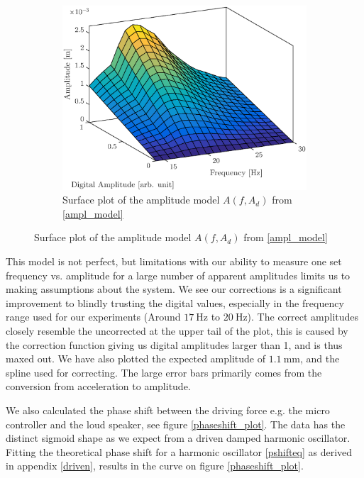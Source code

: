 \documentclass[12pt,oneside,a4paper]{article}
\numberwithin{equation}{section}
\begin{document}
{{{{\begin{figure}[h]
\begin{subfigure}[t]{0.49\textwidth}
		\label{frq_vs_ampl_plot}
	\end{subfigure}\hfill
	\begin{subfigure}[t]{0.49\textwidth}
		\centering
		\includegraphics[width=\textwidth]{surfplot}
		\caption{Surface plot of the amplitude model $A(f,A_{d})$ from \eqref{ampl_model}}
	\end{subfigure}
\end{figure}
This model is not perfect, but limitations with our ability to measure one set frequency vs. amplitude for a large number of apparent amplitudes limits us to making assumptions about the system. We see our corrections is a significant improvement to blindly trusting the digital values, especially in the frequency range used for our experiments (Around $\SI{17}{\hertz}$ to $\SI{20}{\hertz}$). The correct amplitudes closely resemble the uncorrected at the upper tail of the plot, this is caused by the correction function giving us digital amplitudes larger than 1, and is thus maxed out. We have also plotted the expected amplitude of $\SI{1.1}{\mm}$, and the spline used for correcting. The large error bars primarily comes from the conversion from acceleration to amplitude.

We also calculated the phase shift between the driving force e.g. the micro controller and the loud speaker, see figure \ref{phaseshift_plot}. The data has the distinct sigmoid shape as we expect from a driven damped harmonic oscillator. Fitting the theoretical phase shift for a harmonic oscillator \ref{pshifteq} as derived in appendix \ref{driven}, results in the curve on figure \ref{phaseshift_plot}.
 
}}}}
\end{document}
